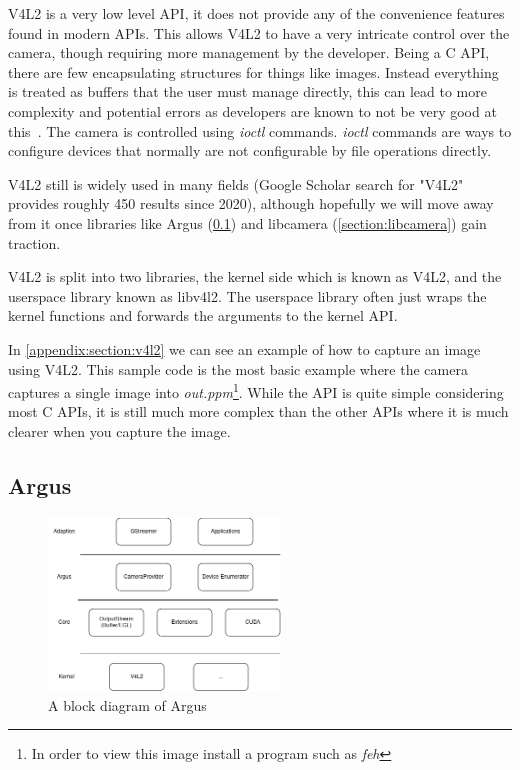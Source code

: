 V4L2 is a very low level API, it does not provide any of the convenience
features found  in modern APIs. This allows V4L2 to have a very intricate
control over the camera, though requiring more management by the developer.
Being a C API, there are few encapsulating structures for things like images.
Instead everything is treated as buffers that the user must manage directly,
this can lead to more complexity and potential errors as developers are known
to not be very good at this~\cite{van2012memory}. The camera is controlled
using \textit{ioctl} commands. \textit{ioctl} commands are ways to configure
devices that normally are not configurable by file operations directly.

V4L2 still is widely used in many fields (Google Scholar search for "V4L2"
provides roughly 450 results since 2020), although hopefully we will move away from it
once libraries like Argus (\cref{section:argus}) and libcamera
(\cref{section:libcamera}) gain traction.

V4L2 is split into two libraries, the kernel side which is known as V4L2, and the
userspace library known as libv4l2. The userspace library often just wraps the
kernel functions and forwards the arguments to the kernel API.

In \cref{appendix:section:v4l2} we can see an example of how to capture an
image using V4L2. This sample code is the most basic example where the camera
captures a single image into \textit{out.ppm}\footnote{In order to view this
image install a program such as \textit{feh}}. While the API is quite simple
considering most C APIs, it is still much more complex than the other APIs
where it is much clearer when you capture the image.

\subsection{Argus}\label{section:argus}
\begin{figure}
    \begin{center}
        \includegraphics[width=0.55\textwidth]{figures/argus.png}
    \end{center}
    \caption{A block diagram of Argus}\label{fig:argusblock}
\end{figure}


